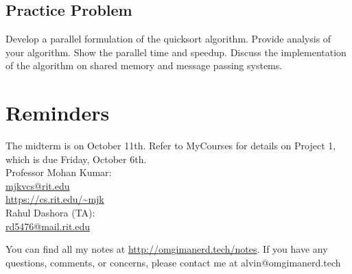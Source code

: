 \documentclass{math}
\begin{document}
\subsection*{Practice Problem}
Develop a parallel formulation of the quicksort algorithm. Provide analysis of
your algorithm. Show the parallel time and speedup. Discuss the implementation
of the algorithm on shared memory and message passing systems.

\section*{Reminders}
The midterm is on October 11th.
Refer to MyCourses for details on Project 1, which is due Friday,
October 6th. \\

\noindent Professor Mohan Kumar: \\
\url{mjkvcs@rit.edu} \\
\url{https://cs.rit.edu/~mjk} \\

\noindent Rahul Dashora (TA): \\
\url{rd5476@mail.rit.edu} \\

\begin{center}
  You can find all my notes at \url{http://omgimanerd.tech/notes}. If you have
  any questions, comments, or concerns, please contact me at
  alvin@omgimanerd.tech
\end{center}
\end{document}
